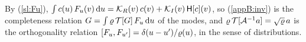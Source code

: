 By (\ref{sl:Fu}), $\int c(u)\,F_u(v)\,\mathrm{d} u=\mathcal K_R(v)\,c(v)+\mathcal K_I(v)\,\mathsf H[c](v)$, so (\ref{appB:inv}) is the completeness relation $G=\int\varrho\,\mathcal T[G]\,F_u\,\mathrm{d} u$ of the modes, and $\varrho\,\mathcal T[\mathcal A^{-1}a]=\sqrt\varrho\,a$ is the orthogonality relation $[F_u,F_{u'}]=\delta(u-u')/\varrho(u)$, in the sense of distributions.
